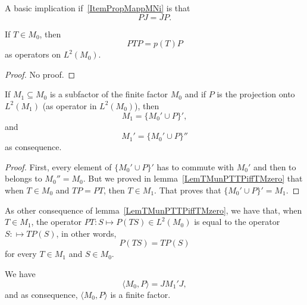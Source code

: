 A basic implication if~\ref{ItemPropMappMNi} is that
\begin{equation}
	PJ=JP.
\end{equation}


\begin{lemma}		\label{LemPTPpTPopLdeux}
If $T\in M_0$, then
\begin{equation}
	PTP=p(T)P
\end{equation}
as operators on $L^2(M_0)$.
\end{lemma}

\begin{proof}
No proof.
\end{proof}

\begin{lemma}		\label{LemNMpPNcup}
If $M_1\subseteq M_0$ is a subfactor of the finite factor $M_0$ and if $P$ is the projection onto $L^2(M_1)$ (as operator in $L^2(M_0)$), then
\begin{equation}
	M_1=\{ M_0'\cup P \}',
\end{equation}
and
\begin{equation}
	M_1'=\{ M_0'\cup P \}''
\end{equation}
as consequence.
\end{lemma}

\begin{proof}
First, every element of $\{ M_0'\cup P \}'$ has to commute with $M_0'$ and then to belongs to $M_0''=M_0$. But we proved in lemma~\ref{LemTMunPTTPiffTMzero} that when $T\in M_0$ and $TP=PT$, then $T\in M_1$. That proves that $\{ M_0'\cup P \}'=M_1$.
\end{proof}

As other consequence of lemma~\ref{LemTMunPTTPiffTMzero}, we have that, when $T\in M_1$, the operator $PT\colon S\mapsto P(TS)\in L^2(M_0)$ is equal to the operator $S\colon \mapsto TP(S)$, in other words,
\begin{equation}		\label{EqPTSeqalTPS}
	P(TS)=TP(S)
\end{equation}
for every $T\in M_1$ and $S\in M_0$.

\begin{lemma}		\label{LemMOJNJequal}
We have
\begin{equation}		\label{EqLemMPJNJequal}
	\langle M_0, P\rangle =JM_1'J,
\end{equation}
and as consequence, $\langle M_0, P\rangle $ is a finite factor.
\end{lemma}

